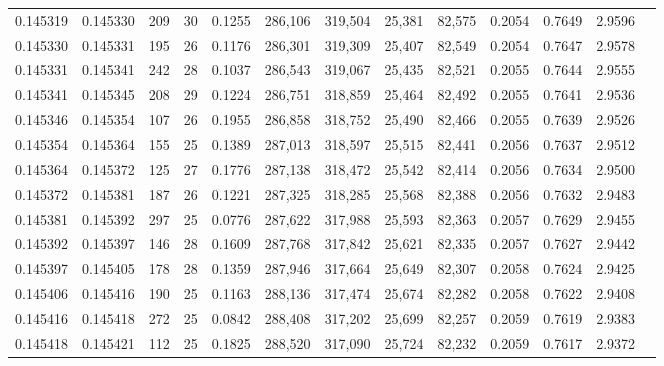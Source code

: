 \begin{tabular}{rrrrrrrrrrrrr}
0.145319 & 0.145330 & 209 &  30 &                                     0.1255 & 286,106 & 319,504 &  25,381 &  82,575 & 0.2054 & 0.7649 & 2.9596 \\
0.145330 & 0.145331 & 195 &  26 &                                     0.1176 & 286,301 & 319,309 &  25,407 &  82,549 & 0.2054 & 0.7647 & 2.9578 \\
0.145331 & 0.145341 & 242 &  28 &                                     0.1037 & 286,543 & 319,067 &  25,435 &  82,521 & 0.2055 & 0.7644 & 2.9555 \\
0.145341 & 0.145345 & 208 &  29 &                                     0.1224 & 286,751 & 318,859 &  25,464 &  82,492 & 0.2055 & 0.7641 & 2.9536 \\
0.145346 & 0.145354 & 107 &  26 &                                     0.1955 & 286,858 & 318,752 &  25,490 &  82,466 & 0.2055 & 0.7639 & 2.9526 \\
0.145354 & 0.145364 & 155 &  25 &                                     0.1389 & 287,013 & 318,597 &  25,515 &  82,441 & 0.2056 & 0.7637 & 2.9512 \\
0.145364 & 0.145372 & 125 &  27 &                                     0.1776 & 287,138 & 318,472 &  25,542 &  82,414 & 0.2056 & 0.7634 & 2.9500 \\
0.145372 & 0.145381 & 187 &  26 &                                     0.1221 & 287,325 & 318,285 &  25,568 &  82,388 & 0.2056 & 0.7632 & 2.9483 \\
0.145381 & 0.145392 & 297 &  25 &                                     0.0776 & 287,622 & 317,988 &  25,593 &  82,363 & 0.2057 & 0.7629 & 2.9455 \\
0.145392 & 0.145397 & 146 &  28 &                                     0.1609 & 287,768 & 317,842 &  25,621 &  82,335 & 0.2057 & 0.7627 & 2.9442 \\
0.145397 & 0.145405 & 178 &  28 &                                     0.1359 & 287,946 & 317,664 &  25,649 &  82,307 & 0.2058 & 0.7624 & 2.9425 \\
0.145406 & 0.145416 & 190 &  25 &                                     0.1163 & 288,136 & 317,474 &  25,674 &  82,282 & 0.2058 & 0.7622 & 2.9408 \\
0.145416 & 0.145418 & 272 &  25 &                                     0.0842 & 288,408 & 317,202 &  25,699 &  82,257 & 0.2059 & 0.7619 & 2.9383 \\
0.145418 & 0.145421 & 112 &  25 &                                     0.1825 & 288,520 & 317,090 &  25,724 &  82,232 & 0.2059 & 0.7617 & 2.9372 \\

\end{tabular}
